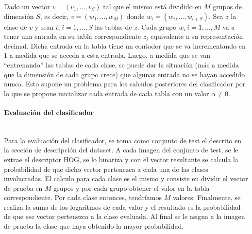 			Dado un vector $v=(v_1, \dots, v_S)$  tal que el mismo está dividido en $M$ grupos de dimensión $S$, es decir, $v=(w_1,\dots,w_M)$ donde $w_i=(w_i,\dots,w_{i+S})$. Sea $z$ la clase de $v$ y sean $t_i~ i=1, \dots, S$ las tablas de $z$. Cada grupo $w_i~ i=1, \dots, M$ va a tener una entrada en su tabla correspondiente $z_i$ equivalente a su representación decimal. Dicha entrada en la tabla tiene un contador que se va incrementando en $1$ a medida que se acceda a esta entrada. Luego, a medida que se van ``entrenando'' las tablas de cada clase, se puede dar la situación (más a medida que la dimensión de cada grupo crece) que algunas entrada no se hayan accedido nunca. Esto supone un problema para los calculos posteriores del clasificador por lo que se propone inicializar cada entrada de cada tabla con un valor $\alpha \neq 0$. 

		\paragraph{Evaluación del clasificador} ~\\

			Para la evaluación del clasificador, se toma como conjunto de test el descrito en la sección de descripción del dataset. A cada imagen del conjunto de test, se le extrae el descriptor HOG, se lo binariza y con el vector resultante se calcula la probabilidad de que dicho vector pertenezca a cada una de las clases involucradas. El calculo para cada clase es el mismo y consiste en dividir el vector de prueba en $M$ grupos y por cada grupo obtener el valor en la tabla correspondiente. Por cada clase entonces, tendríamos $M$ valores. Finalmente, se realiza la suma de los logaritmos de cada valor y el resultado es la probabilidad de que ese vector pertenezca a la clase evaluada. Al final se le asigna a la imagen de prueba la clase que haya obtenido la mayor probabilidad.

